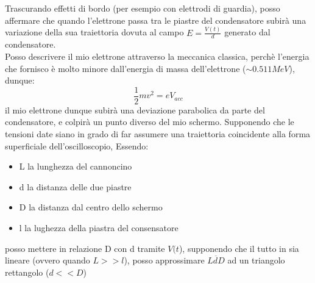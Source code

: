 \documentclass{article}
\begin{document}
\begin{center}
\end{center}

Trascurando effetti di bordo (per esempio con elettrodi di guardia), posso affermare che quando l'elettrone passa tra le piastre del condensatore subirà una variazione della sua traiettoria dovuta al campo 
$E= \frac{V(t)}{d}$ generato dal condensatore. \\
Posso descrivere il mio elettrone attraverso la meccanica classica, perchè l'energia che fornisco è molto minore dall'energia di massa dell'elettrone 
($ \sim 0.511 MeV$), dunque:
\[
\frac{1}{2}m v^2= e V_{acc}
\]
il mio elettrone dunque subirà una deviazione parabolica da parte del condensatore, e colpirà un punto diverso del mio schermo.
Supponendo che le tensioni date siano in grado di far assumere una traiettoria coincidente alla forma superficiale dell'oscilloscopio,
Essendo:
\begin{itemize}
   \item  L la lunghezza del cannoncino
   \item  d la distanza delle due piastre 
   \item  D la distanza dal centro dello schermo
   \item  l la lughezza della piastra del consensatore
\end{itemize} 
posso mettere in relazione D con d tramite $V(t$), supponendo che il tutto in sia lineare (ovvero quando $L >>l$), posso approssimare $\overline{LdD}$
ad un triangolo rettangolo ($d<<D$)
\end{document}

